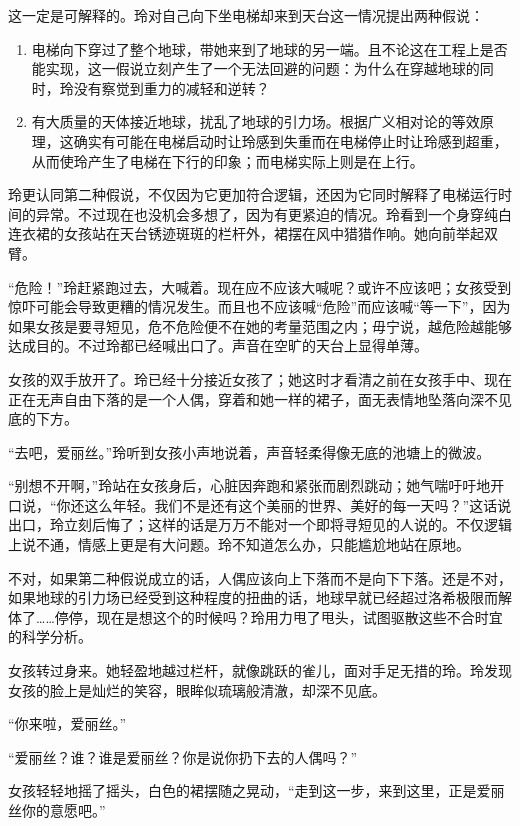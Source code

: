 这一定是可解释的。玲对自己向下坐电梯却来到天台这一情况提出两种假说：
\begin{enumerate}[nosep]
\item 电梯向下穿过了整个地球，带她来到了地球的另一端。且不论这在工程上是否能实现，这一假说立刻产生了一个无法回避的问题：为什么在穿越地球的同时，玲没有察觉到重力的减轻和逆转？
\item 有大质量的天体接近地球，扰乱了地球的引力场。根据广义相对论的等效原理，这确实有可能在电梯启动时让玲感到失重而在电梯停止时让玲感到超重，从而使玲产生了电梯在下行的印象；而电梯实际上则是在上行。
\end{enumerate}

玲更认同第二种假说，不仅因为它更加符合逻辑，还因为它同时解释了电梯运行时间的异常。不过现在也没机会多想了，因为有更紧迫的情况。玲看到一个身穿纯白连衣裙的女孩站在天台锈迹斑斑的栏杆外，裙摆在风中猎猎作响。她向前举起双臂。

“危险！”玲赶紧跑过去，大喊着。现在应不应该大喊呢？或许不应该吧；女孩受到惊吓可能会导致更糟的情况发生。而且也不应该喊“危险”而应该喊“等一下”，因为如果女孩是要寻短见，危不危险便不在她的考量范围之内；毋宁说，越危险越能够达成目的。不过玲都已经喊出口了。声音在空旷的天台上显得单薄。

女孩的双手放开了。玲已经十分接近女孩了；她这时才看清之前在女孩手中、现在正在无声自由下落的是一个人偶，穿着和她一样的裙子，面无表情地坠落向深不见底的下方。

“去吧，爱丽丝。”玲听到女孩小声地说着，声音轻柔得像无底的池塘上的微波。

“别想不开啊，”玲站在女孩身后，心脏因奔跑和紧张而剧烈跳动；她气喘吁吁地开口说，“你还这么年轻。我们不是还有这个美丽的世界、美好的每一天吗？”这话说出口，玲立刻后悔了；这样的话是万万不能对一个即将寻短见的人说的。不仅逻辑上说不通，情感上更是有大问题。玲不知道怎么办，只能尴尬地站在原地。

不对，如果第二种假说成立的话，人偶应该向上下落而不是向下下落。还是不对，如果地球的引力场已经受到这种程度的扭曲的话，地球早就已经超过洛希极限而解体了……停停，现在是想这个的时候吗？玲用力甩了甩头，试图驱散这些不合时宜的科学分析。

女孩转过身来。她轻盈地越过栏杆，就像跳跃的雀儿，面对手足无措的玲。玲发现女孩的脸上是灿烂的笑容，眼眸似琉璃般清澈，却深不见底。

“你来啦，爱丽丝。”

“爱丽丝？谁？谁是爱丽丝？你是说你扔下去的人偶吗？”

女孩轻轻地摇了摇头，白色的裙摆随之晃动，“走到这一步，来到这里，正是爱丽丝你的意愿吧。”

